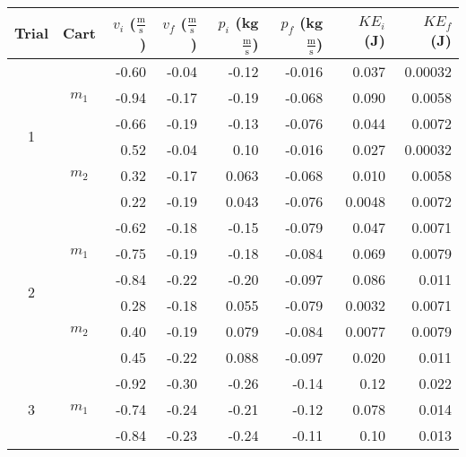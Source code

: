 \documentclass [12pt, letterpaper, twoside] {article}
\begin{document}
\begin {table}[h]
  \centering
  \begin {tabular} {| c | c | r | r | r | r | r | r |}
    \hline\hline
    Trial & Cart & \(v_{i}\) (\(\tfrac{\text{m}}{\text{s}}\)) & \(v_{f}\) (\(\tfrac{\text{m}}{\text{s}}\)) & \(p_{i}\) (kg\(\tfrac{\text{m}}{\text{s}}\)) & \(p_{f}\) (kg\(\tfrac{\text{m}}{\text{s}}\)) & \(KE_{i}\) (J) & \(KE_{f}\) (J) \\
    \hline
    \multirow {6}{*}{1} & \multirow {3}{*}{\(m_{1}\)} & -0.60 & -0.04 & -0.12 & -0.016 & 0.037 & 0.00032 \\ %
    & & -0.94 & -0.17 & -0.19 & -0.068 & 0.090 & 0.0058 \\ %
    & & -0.66 & -0.19 & -0.13 & -0.076 & 0.044 & 0.0072 \\ %
    \cline{2-8}
    & \multirow {3}{*}{\(m_{2}\)} & 0.52 & -0.04 & 0.10 & -0.016 & 0.027 & 0.00032 \\ %
    & & 0.32 & -0.17 & 0.063 & -0.068 & 0.010 & 0.0058 \\ %
    & & 0.22 & -0.19 & 0.043 & -0.076 & 0.0048 & 0.0072 \\ %
    \hline
    \multirow {6}{*}{2} & \multirow {3}{*}{\(m_{1}\)} & -0.62 & -0.18 & -0.15 & -0.079 & 0.047 & 0.0071 \\ %
    & & -0.75 & -0.19 & -0.18 & -0.084 & 0.069 & 0.0079 \\ %
    & & -0.84 & -0.22 & -0.20 & -0.097 & 0.086 & 0.011 \\ %
    \cline{2-8}
    & \multirow {3}{*}{\(m_{2}\)} & 0.28 & -0.18 & 0.055 & -0.079 & 0.0032 & 0.0071 \\ %
    & & 0.40 & -0.19 & 0.079 & -0.084 & 0.0077 & 0.0079 \\ %
    & & 0.45 & -0.22 & 0.088 & -0.097 & 0.020 & 0.011 \\ %
    \hline
    \multirow {6}{*}{3} & \multirow {3}{*}{\(m_{1}\)} & -0.92 & -0.30 & -0.26 & -0.14 & 0.12 & 0.022 \\ %
    & & -0.74 & -0.24 & -0.21 & -0.12 & 0.078 & 0.014 \\ %
    & & -0.84 & -0.23 & -0.24 & -0.11 & 0.10 & 0.013 \\ %

\end{tabular}
\end{table}
\end{document}
